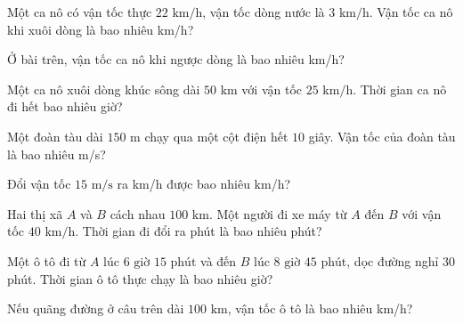 \begin{ex}
  Một ca nô có vận tốc thực $22\text{ km/h}$, vận tốc dòng nước là $3\text{ km/h}$. Vận tốc ca nô khi xuôi dòng là bao nhiêu km/h?
\end{ex}

\begin{ex}
  Ở bài trên, vận tốc ca nô khi ngược dòng là bao nhiêu km/h?
\end{ex}

\begin{ex}
  Một ca nô xuôi dòng khúc sông dài $50\text{ km}$ với vận tốc $25\text{ km/h}$. Thời gian ca nô đi hết bao nhiêu giờ?
\end{ex}

\begin{ex}
  Một đoàn tàu dài $150\text{ m}$ chạy qua một cột điện hết $10$ giây. Vận tốc của đoàn tàu là bao nhiêu m/s?
\end{ex}

\begin{ex}
  Đổi vận tốc $15\text{ m/s}$ ra km/h được bao nhiêu km/h?
\end{ex}

\begin{ex}
  Hai thị xã $A$ và $B$ cách nhau $100\text{ km}$. Một người đi xe máy từ $A$ đến $B$ với vận tốc $40\text{ km/h}$. Thời gian đi đổi ra phút là bao nhiêu phút?
\end{ex}

\begin{ex}
  Một ô tô đi từ $A$ lúc $6\text{ giờ } 15\text{ phút}$ và đến $B$ lúc $8\text{ giờ } 45\text{ phút}$, dọc đường nghỉ $30$ phút. Thời gian ô tô thực chạy là bao nhiêu giờ?
\end{ex}

\begin{ex}
  Nếu quãng đường ở câu trên dài $100\text{ km}$, vận tốc ô tô là bao nhiêu km/h?
\end{ex}

